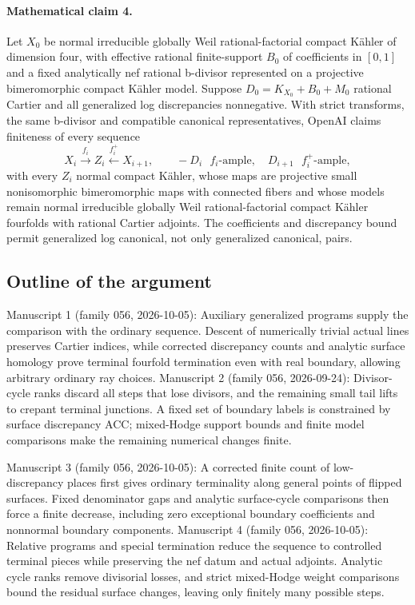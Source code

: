 \documentclass[11pt]{article}
\begin{document}
\paragraph{Mathematical claim 4.} Let $X_0$ be normal irreducible globally Weil rational-factorial compact Kähler of dimension four, with effective rational finite-support $B_0$ of coefficients in $[0,1]$ and a fixed analytically nef rational b-divisor represented on a projective bimeromorphic compact Kähler model. Suppose $D_0=K_{X_0}+B_0+M_0$ rational Cartier and all generalized log discrepancies nonnegative. With strict transforms, the same b-divisor and compatible canonical representatives, OpenAI claims finiteness of every sequence
\[
X_i\xrightarrow{f_i}Z_i\xleftarrow{f_i^+}X_{i+1},\qquad
-D_i\text{ }f_i\text{-ample},\quad D_{i+1}\text{ }f_i^+\text{-ample},
\]
with every $Z_i$ normal compact Kähler, whose maps are projective small nonisomorphic bimeromorphic maps with connected fibers and whose models remain normal irreducible globally Weil rational-factorial compact Kähler fourfolds with rational Cartier adjoints. The coefficients and discrepancy bound permit generalized log canonical, not only generalized canonical, pairs.

\subsection{Outline of the argument}
Manuscript 1 (family 056, 2026-10-05): Auxiliary generalized programs supply the comparison with the ordinary sequence. Descent of numerically trivial actual lines preserves Cartier indices, while corrected discrepancy counts and analytic surface homology prove terminal fourfold termination even with real boundary, allowing arbitrary ordinary ray choices. Manuscript 2 (family 056, 2026-09-24): Divisor-cycle ranks discard all steps that lose divisors, and the remaining small tail lifts to crepant terminal junctions. A fixed set of boundary labels is constrained by surface discrepancy ACC; mixed-Hodge support bounds and finite model comparisons make the remaining numerical changes finite.

Manuscript 3 (family 056, 2026-10-05): A corrected finite count of low-discrepancy places first gives ordinary terminality along general points of flipped surfaces. Fixed denominator gaps and analytic surface-cycle comparisons then force a finite decrease, including zero exceptional boundary coefficients and nonnormal boundary components. Manuscript 4 (family 056, 2026-10-05): Relative programs and special termination reduce the sequence to controlled terminal pieces while preserving the nef datum and actual adjoints. Analytic cycle ranks remove divisorial losses, and strict mixed-Hodge weight comparisons bound the residual surface changes, leaving only finitely many possible steps.
\end{document}
